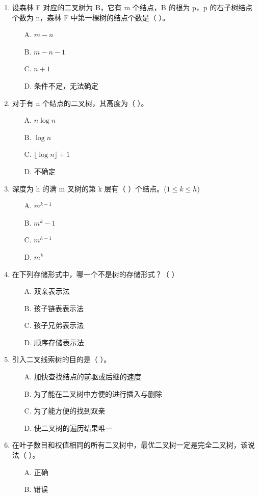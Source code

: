 \documentclass[12pt, a4paper]{article}
\begin{document}
\begin{enumerate}
    \item 设森林 F 对应的二叉树为 B，它有 m 个结点，B 的根为 p，p 的右子树结点个数为 n，森林 F 中第一棵树的结点个数是（ ）。
    \begin{enumerate}
        \item[A.] $m-n$
        \item[B.] $m-n-1$
        \item[C.] $n+1$
        \item[D.] 条件不足，无法确定
    \end{enumerate}
    
    \item 对于有 n 个结点的二叉树，其高度为（ ）。
    \begin{enumerate}
        \item[A.] $n \log n$
        \item[B.] $\log n$
        \item[C.] $\lfloor \log n \rfloor + 1$
        \item[D.] 不确定
    \end{enumerate}
    
    \item 深度为 h 的满 m 叉树的第 k 层有（ ）个结点。($1 \le k \le h$)
    \begin{enumerate}
        \item[A.] $m^{k-1}$
        \item[B.] $m^k-1$
        \item[C.] $m^{h-1}$
        \item[D.] $m^k$
    \end{enumerate}
    
    \item 在下列存储形式中，哪一个不是树的存储形式？（ ）
    \begin{enumerate}
        \item[A.] 双亲表示法
        \item[B.] 孩子链表表示法
        \item[C.] 孩子兄弟表示法
        \item[D.] 顺序存储表示法
    \end{enumerate}
    
    \item 引入二叉线索树的目的是（ ）。
    \begin{enumerate}
        \item[A.] 加快查找结点的前驱或后继的速度
        \item[B.] 为了能在二叉树中方便的进行插入与删除
        \item[C.] 为了能方便的找到双亲
        \item[D.] 使二叉树的遍历结果唯一
    \end{enumerate}
    
    \item 在叶子数目和权值相同的所有二叉树中，最优二叉树一定是完全二叉树，该说法（ ）。
    \begin{enumerate}
        \item[A.] 正确
        \item[B.] 错误
    \end{enumerate}
\end{enumerate}
\end{document}
